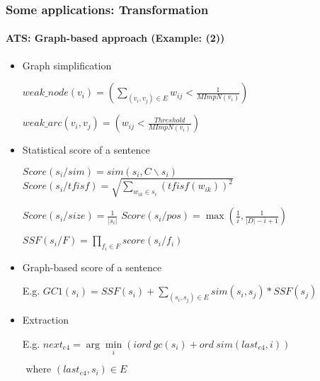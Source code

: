 \documentclass[xcolor=table]{beamer}
\begin{document}
\begin{frame}
	\frametitle{Some applications: Transformation}
	\framesubtitle{ATS: Graph-based approach (Example: \cite{21-aries-al} (2))}
	
	\vspace{-6pt}
	\begin{itemize}
		\item Graph simplification
		
		\hspace{.5cm}$weak\_node(v_i) = ( \sum_{(v_i, v_j) \in E} w_{ij} < \frac{1}{MImpN(v_i)} )$ 
		
		\hspace{.5cm}$weak\_arc(v_i, v_j) = ( w_{ij} < \frac{Threshold}{MImpN(v_i)})$
		
		\item Statistical score of a sentence
		
		\hspace{.5cm}$ Score(s_i/ sim) = sim(s_i, C\backslash s_i) $
		$Score(s_i/ tfisf) = \sqrt{\sum\limits_{w_{ik} \in s_i} (tfisf(w_{ik}))^2}$
		
		\hspace{.5cm}$Score(s_i/ size) = \frac{1}{|s_i|}$
		$Score(s_i/ pos) = \max (\frac{1}{i}, \frac{1}{|D| - i + 1})$
		
		\hspace{.5cm}$SSF(s_i/ F) = \prod_{f_i \in F} score(s_i/f_i)$
		
		\item Graph-based score of a sentence
		
		\hspace{.5cm}E.g. $GC1(s_i) = SSF(s_i) + \sum\limits_{(s_i, s_j) \in E} sim(s_i, s_j) * SSF(s_j)$
		
		\item Extraction
		
		\hspace{.5cm}E.g. $ next_{e4}  =  \arg\min\limits_i (iord\ gc(s_i) + ord\ sim(last_{e4}, i))$ 
		
		\hspace{3cm}$ \text{ where } (last_{e4}, s_i) \in E $
	\end{itemize}
	
\end{frame}
\end{document}
